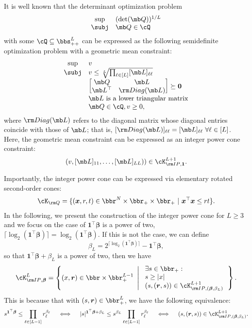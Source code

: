 \documentclass[mnsc, nonblindrev]{informswp}
\newcommand{\1}[1]{\mathds{1}{\left(#1\right)}}
\begin{document}
\begin{appendices}
\begin{example}
It is well known that the determinant optimization problem
$$
\begin{array}{cl}
\sup & (\det (\mb Q))^{1/L} \\
\subj & \mb Q \in \cQ
\end{array}
$$
with some $\cQ \subseteq \bbs^L_{++}$ can be expressed as the following semidefinite optimization problem with a geometric mean constraint:
$$
\begin{array}{cl}
\sup &  v\\
\subj & v \leq \sqrt[L]{\prod_{\ell \in [L]} [\mb L]_{\ell \ell}} \\
& \begin{bmatrix}\mb Q & \mb L \\
\mb L^\top & {\rm Diag}(\mb L)
\end{bmatrix} \succeq \bm 0 \\
& \mb L ~\mbox{is a lower triangular matrix}\\
& \mb Q \in \cQ, v \geq 0,
\end{array}
$$
where ${\rm Diag}(\mb L)$ refers to the diagonal matrix whose diagonal entries coincide with those of $\mb L$; that is, $[{\rm Diag}(\mb L)]_{\ell \ell} = [\mb L]_{\ell \ell} ~\forall \ell \in [L]$.
Here, the geometric mean constraint can be expressed as an integer power cone constraint:
$$
(v,[\mb L]_{11},\dots,[\mb L]_{LL} )) \in \cK^{L+1}_{{\rm IP},\bm 1}. 
$$
\end{example}

Importantly, the integer power cone can be expressed via elementary rotated second-order cones:
$$
\cK_{\rm Q} = \{ (\bm x,r,t) \in \bbr^{N} \times \bbr_+ \times \bbr_+ ~|~ \bm x^\top \bm x \leq rt \}. 
$$
In the following, we present the construction of the integer power cone for $L \geq 3$ and we focus on the case of $\bm 1^\top \bm \beta$ is a power of two, \ie $\lceil \log_2(\bm 1^\top \bm \beta) \rceil = \log_2(\bm 1^\top \bm \beta)$. If this is not the case, we can define 
$$
\beta_L = 2^{\lceil\log_2(\bm 1^\top \bm \beta) \rceil} - \bm 1^\top \bm \beta,
$$
so that $\bm 1^\top \bm \beta + \beta_L$ is a power of two, then we have 
$$
\cK^{L}_{{\rm IP},\bm \beta} = \left\{ (x,\bm r) \in \bbr \times \bbr^{L-1}_+ ~\left|~
\begin{array}{l}
\exists s \in \bbr_+:\\
s \geq |x| \\
(s, (\bm r,s)) \in  \cK^{L+1}_{{\rm IP},(\bm \beta,\beta_L)} 
\end{array}
\right.\right\}.
$$
This is because that with $(s,\bm r) \in \bbr^L_+$, we have the following equivalence:
$$
s^{\bm 1^\top \bm \beta} \leq \prod_{\ell \in [L-1]} r^{\beta_\ell}_\ell 
~~~\iff~~~
|s|^{\bm 1^\top \bm \beta+\beta_L} \leq s^{\beta_L} \prod_{\ell \in [L-1]} r^{\beta_\ell}_\ell \\
~~~\iff~~~
(s, (\bm r,s)) \in  \cK^{L+1}_{{\rm IP},(\bm \beta,\beta_L)}.
$$


\end{appendices}
\end{document}
